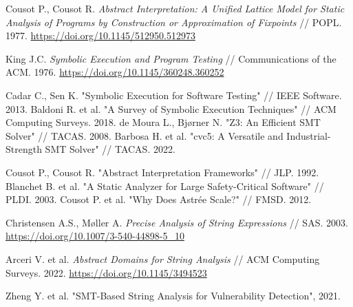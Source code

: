 
\newpage



\newpage



\newpage
\begin{thebibliography}{1}

 Cousot P., Cousot R. \emph{Abstract Interpretation: A Unified Lattice Model for Static Analysis of Programs by Construction or Approximation of Fixpoints} // POPL. 1977.  
\url{https://doi.org/10.1145/512950.512973}

 King J.C. \emph{Symbolic Execution and Program Testing} // Communications of the ACM. 1976.  
\url{https://doi.org/10.1145/360248.360252}

 Cadar C., Sen K. "Symbolic Execution for Software Testing" // IEEE Software. 2013.
 Baldoni R. et al. "A Survey of Symbolic Execution Techniques" // ACM Computing Surveys. 2018.
 de Moura L., Bjørner N. "Z3: An Efficient SMT Solver" // TACAS. 2008.
 Barbosa H. et al. "cvc5: A Versatile and Industrial-Strength SMT Solver" // TACAS. 2022.

 Cousot P., Cousot R. "Abstract Interpretation Frameworks" // JLP. 1992.
 Blanchet B. et al. "A Static Analyzer for Large Safety-Critical Software" // PLDI. 2003.
 Cousot P. et al. "Why Does Astrée Scale?" // FMSD. 2012.



 Christensen A.S., Møller A. \emph{Precise Analysis of String Expressions} // SAS. 2003.  
\url{https://doi.org/10.1007/3-540-44898-5_10}

 Arceri V. et al. \emph{Abstract Domains for String Analysis} // ACM Computing Surveys. 2022.  
\url{https://doi.org/10.1145/3494523}

 Zheng Y. et al. "SMT-Based String Analysis for Vulnerability Detection", 2021.


\end{thebibliography}

